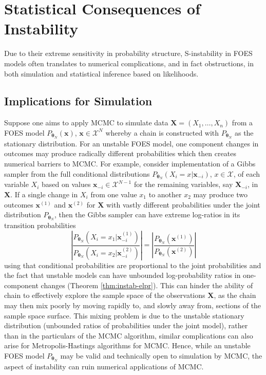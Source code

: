 \documentclass[]{article}
\theoremstyle{definition}
\begin{document}
\section{Statistical Consequences of Instability}\label{implications}

Due to their extreme sensitivity in probability structure, S-instability
in FOES models often translates to numerical complications, and in fact
obstructions, in both simulation and statistical inference based on
likelihoods.

\subsection{Implications for Simulation}\label{mcmc}

Suppose one aims to apply MCMC to simulate data
\(\boldsymbol X=(X_1,\ldots,X_n)\) from a FOES model
\(P_{\boldsymbol \theta_N}(\boldsymbol x)\),
\(\boldsymbol x \in\mathcal{X}^N\) whereby a chain is constructed with
\(P_{\boldsymbol \theta_N}\) as the stationary distribution. For an
unstable FOES model, one component changes in outcomes may produce
radically different probabilities which then creates numerical barriers
to MCMC. For example, consider implementation of a Gibbs sampler from
the full conditional distributions
\(P_{\boldsymbol \theta_N} (X_i = x| \boldsymbol x_{-i})\),
\(x\in\mathcal{X}\), of each variable \(X_i\) based on values
\(\boldsymbol x_{-i}\in \mathcal{X}^{N-1}\) for the remaining variables,
say \(\boldsymbol X_{-i}\), in \(\boldsymbol X\). If a single change in
\(X_i\) from one value \(x_1\) to another \(x_2\) may produce two
outcomes \(\boldsymbol x^{(1)}\) and \(\boldsymbol x^{(2)}\) for
\(\boldsymbol X\) with vastly different probabilities under the joint
distribution \(P_{\boldsymbol \theta_N}\), then the Gibbs sampler can
have extreme log-ratios in its transition probabilities \[
\left| \frac{P_{\boldsymbol \theta_N} (X_i =x_1 | \boldsymbol x^{(1)}_{-i})}{P_{\boldsymbol \theta_N} (X_i = x_2| \boldsymbol x^{(2)}_{-i}) } \right|=\left| \frac{P_{\boldsymbol \theta_N} ( \boldsymbol x^{(1)} )}{P_{\boldsymbol \theta_N} (  \boldsymbol x^{(2)} ) } \right|
\] using that conditional probabilities are proportional to the joint
probabilities and the fact that unstable models can have unbounded
log-probability ratios in one-component changes (Theorem
\ref{thm:instab-elpr}). This can hinder the ability of chain to
effectively explore the sample space of the observations
\(\boldsymbol X\), as the chain may then mix poorly by moving rapidly
to, and slowly away from, sections of the sample space surface. This
mixing problem is due to the unstable stationary distribution (unbounded
ratios of probabilities under the joint model), rather than in the
particulars of the MCMC algorithm, similar complications can also arise
for Metropolis-Hastings algorithms for MCMC. Hence, while an unstable
FOES model \(P_{\boldsymbol \theta_N}\) may be valid and technically
open to simulation by MCMC, the aspect of instability can ruin numerical
applications of MCMC.
\end{document}
